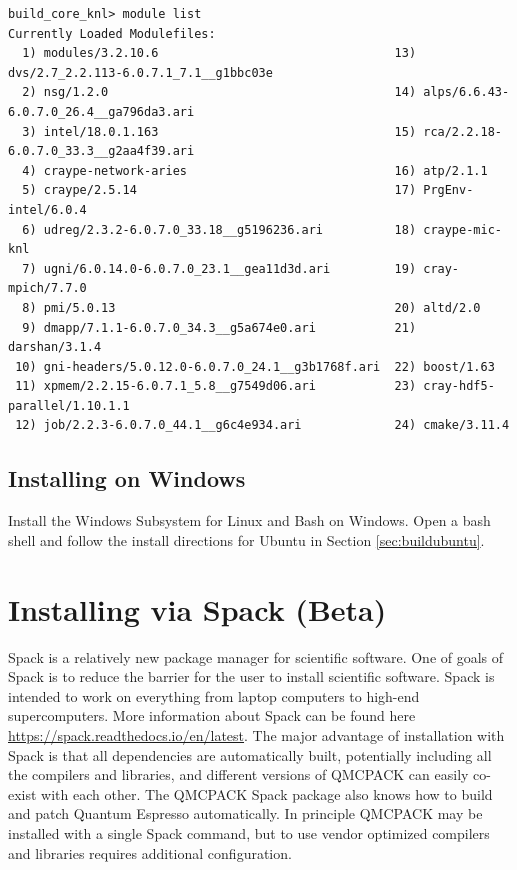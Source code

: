 \verbatimfont{\footnotesize}
\begin{verbatim}
build_core_knl> module list
Currently Loaded Modulefiles:
  1) modules/3.2.10.6                                 13) dvs/2.7_2.2.113-6.0.7.1_7.1__g1bbc03e
  2) nsg/1.2.0                                        14) alps/6.6.43-6.0.7.0_26.4__ga796da3.ari
  3) intel/18.0.1.163                                 15) rca/2.2.18-6.0.7.0_33.3__g2aa4f39.ari
  4) craype-network-aries                             16) atp/2.1.1
  5) craype/2.5.14                                    17) PrgEnv-intel/6.0.4
  6) udreg/2.3.2-6.0.7.0_33.18__g5196236.ari          18) craype-mic-knl
  7) ugni/6.0.14.0-6.0.7.0_23.1__gea11d3d.ari         19) cray-mpich/7.7.0
  8) pmi/5.0.13                                       20) altd/2.0
  9) dmapp/7.1.1-6.0.7.0_34.3__g5a674e0.ari           21) darshan/3.1.4
 10) gni-headers/5.0.12.0-6.0.7.0_24.1__g3b1768f.ari  22) boost/1.63
 11) xpmem/2.2.15-6.0.7.1_5.8__g7549d06.ari           23) cray-hdf5-parallel/1.10.1.1
 12) job/2.2.3-6.0.7.0_44.1__g6c4e934.ari             24) cmake/3.11.4

\end{verbatim}

\subsection{Installing on Windows}
Install the Windows Subsystem for Linux and Bash on Windows.
Open a bash shell and follow the install directions for Ubuntu in Section \ref{sec:buildubuntu}.

\section{Installing via Spack (Beta)}
Spack is a relatively new package manager for scientific software.
One of goals of Spack is to reduce the barrier for the user to install scientific
software. Spack is intended to work on everything from laptop
computers to high-end supercomputers. More information about Spack can
be found here \url{https://spack.readthedocs.io/en/latest}. The major
advantage of installation with Spack is that all dependencies are
automatically built, potentially including all the compilers and libraries, and
different versions of QMCPACK can easily co-exist with each other.
The QMCPACK Spack package also knows how to build
and patch Quantum Espresso automatically. In principle QMCPACK may be installed with
a single Spack command, but to use vendor optimized compilers and libraries requires
additional configuration.

